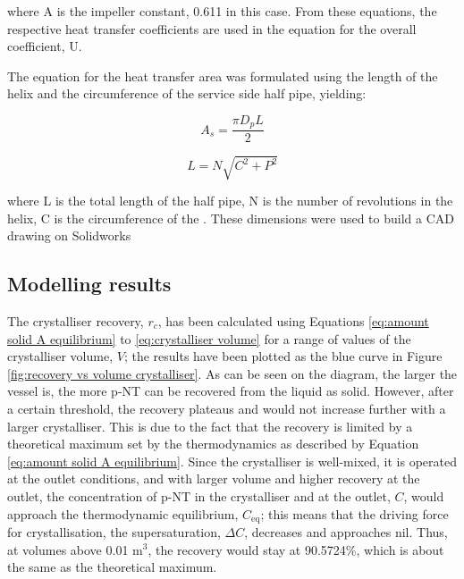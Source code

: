 where A is the impeller constant, 0.611 in this case. From these equations, the respective heat transfer coefficients are used in the equation for the overall coefficient, U.



The equation for the heat transfer area was formulated using the length of the helix and the circumference of the service side half pipe, yielding:

\begin{equation} \label{eq:coolantpipesa}
    A_s = \frac{\pi D_p L}{2}
    \end{equation}
    
\begin{equation}\label{eq:helixlength}
    L = N \sqrt{C^2 + P^2}
\end{equation}

where L is the total length of the half pipe, N is the number of revolutions in the helix, C is the circumference of the . These dimensions were used to build a CAD drawing on Solidworks




\subsection{Modelling results}\label{sec:modelling results crystalliser}

The crystalliser recovery, $r_c$, has been calculated using Equations \ref{eq:amount solid A equilibrium} to \ref{eq:crystalliser volume} for a range of values of the crystalliser volume, $V$; the results have been plotted as the blue curve in Figure \ref{fig:recovery vs volume crystalliser}. As can be seen on the diagram, the larger the vessel is, the more p-NT can be recovered from the liquid as solid. However, after a certain threshold, the recovery plateaus and would not increase further with a larger crystalliser. This is due to the fact that the recovery is limited by a theoretical maximum set by the thermodynamics as described by Equation \ref{eq:amount solid A equilibrium}. Since the crystalliser is well-mixed, it is operated at the outlet conditions, and with larger volume and higher recovery at the outlet, the concentration of p-NT in the crystalliser and at the outlet, $C$, would approach the thermodynamic equilibrium, $C_{\mathrm{eq}}$; this means that the driving force for crystallisation, the supersaturation, $\Delta C$, decreases and approaches nil. Thus, at volumes above 0.01 m$^{3}$, the recovery would stay at 90.5724\%, which is about the same as the theoretical maximum. 

